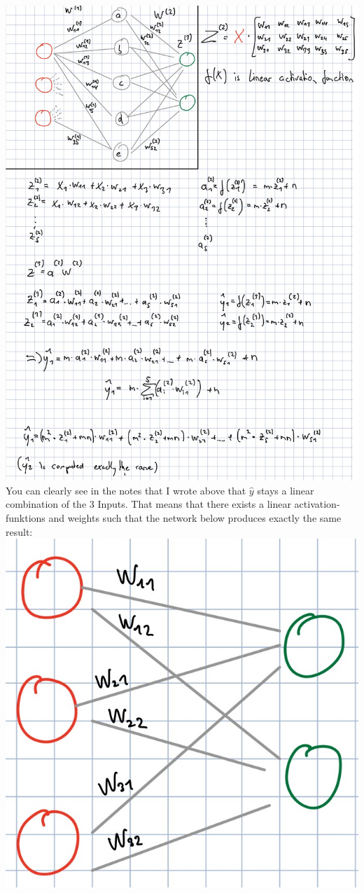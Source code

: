 \documentclass[12pt]{article}
\begin{document}
\begin{enumerate}[a)]
        \newpage
        \includegraphics[scale = 0.35]{pictures/figure01}\\

        You can clearly see in the notes that I wrote above that $\hat{y}$ stays a linear combination of the 3 Inputs. That means that there exists a linear activation-funktions and weights such that the network below produces exactly the same result:\\

        \includegraphics[scale = 0.32]{pictures/figure02}\\

\end{enumerate}
\end{document}
